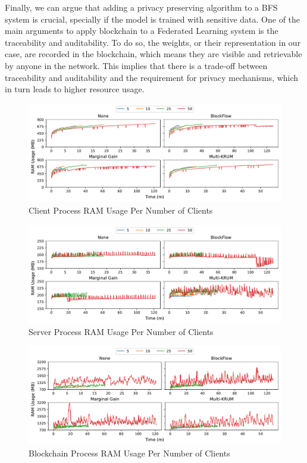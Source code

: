 Finally, we can argue that adding a privacy preserving algorithm to a BFS system is crucial, specially if the model is trained with sensitive data. One of the main arguments to apply blockchain to a Federated Learning system is the traceability and auditability. To do so, the weights, or their representation in our case, are recorded in the blockchain, which means they are visible and retrievable by anyone in the network. This implies that there is a trade-off between traceability and auditability and the requirement for privacy mechanisms, which in turn leads to higher resource usage.

\clearpage

\begin{figure}[!h]
    \centering
    \includegraphics[width=\textwidth]{graphics/clients/ram_client.pdf}
    \caption{Client Process RAM Usage Per Number of Clients}
    \label{fig:ram_clients_clients}
\end{figure}

\vfill

\begin{figure}[!h]
    \centering
    \includegraphics[width=\textwidth]{graphics/clients/ram_server.pdf}
    \caption{Server Process RAM Usage Per Number of Clients}
    \label{fig:ram_clients_servers}
\end{figure}

\vfill

\begin{figure}[!h]
    \centering
    \includegraphics[width=\textwidth]{graphics/clients/ram_miner.pdf}
    \caption{Blockchain Process RAM Usage Per Number of Clients}
    \label{fig:ram_clients_miners}
\end{figure}

